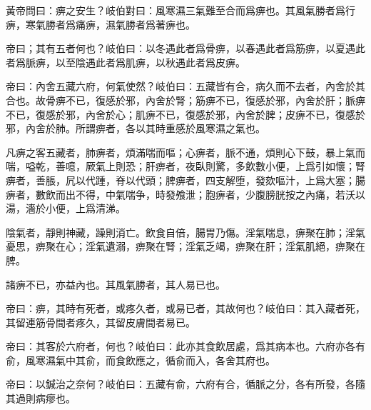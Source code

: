 \documentclass[draft,12pt]{ctexbook}
\begin{document}
\begin{yuanwen}
黃帝問曰：痹之安生？岐伯對曰：風寒濕三氣難至合而爲痹也。其風氣勝者爲行痹，寒氣勝者爲痛痹，濕氣勝者爲著痹也。

帝曰；其有五者何也？岐伯曰：以冬遇此者爲骨痹，以春遇此者爲筋痹，以夏遇此者爲脈痹，以至陰遇此者爲肌痹，以秋遇此者爲皮痹。

帝曰：內舍五藏六府，何氣使然？岐伯曰：五藏皆有合，病久而不去者，內舍於其合也。故骨痹不已，復感於邪，內舍於腎；筋痹不已，復感於邪，內舍於肝；脈痹不已，復感於邪，內舍於心；肌痹不已，復感於邪，內舍於脾；皮痹不已，復感於邪，內舍於肺。所謂痹者，各以其時重感於風寒濕之氣也。

凡痹之客五藏者，肺痹者，煩滿喘而嘔；心痹者，脈不通，煩則心下鼓，暴上氣而喘，嗌乾，善噫，厥氣上則恐；肝痹者，夜臥則驚，多飲數小便，上爲引如懷；腎痹者，善脹，凥以代踵，脊以代頭；脾痹者，四支解堕，發欬嘔汁，上爲大塞；腸痹者，數飲而出不得，中氣喘争，時發飧泄；胞痹者，少腹膀胱按之內痛，若沃以湯，濇於小便，上爲清涕。

陰氣者，靜則神藏，躁則消亡。飲食自倍，腸胃乃傷。淫氣喘息，痹聚在肺；淫氣憂思，痹聚在心；淫氣遺溺，痹聚在腎；淫氣乏竭，痹聚在肝；淫氣肌絕，痹聚在脾。

諸痹不已，亦益內也。其風氣勝者，其人易已也。

帝曰：痹，其時有死者，或疼久者，或易已者，其故何也？岐伯曰：其入藏者死，其留連筋骨間者疼久，其留皮膚間者易已。

帝曰：其客於六府者，何也？岐伯曰：此亦其食飲居處，爲其病本也。六府亦各有俞，風寒濕氣中其俞，而食飲應之，循俞而入，各舍其府也。

帝曰：以鍼治之奈何？岐伯曰：五藏有俞，六府有合，循脈之分，各有所發，各隨其過則病瘳也。
\end{yuanwen}

\end{document}
